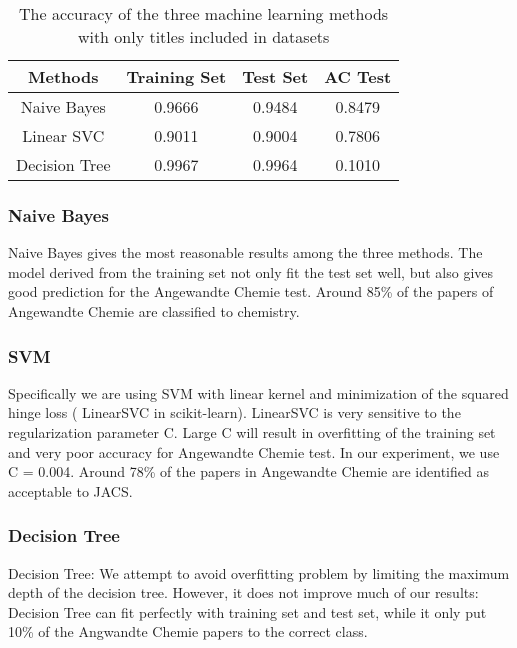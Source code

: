 \documentclass[conference]{IEEEtran}
\begin{document}
\begin{table}
    \caption{The accuracy of the three machine learning methods with only titles included in datasets\label{tab:acc-title}}
    \begin{center}
        \begin{tabular}{c | c | c | c}
            \hline
            \bf{Methods} & \bf{Training Set} & \bf{Test Set} & \bf{AC Test} \\
            \hline
            Naive Bayes & 0.9666 & 0.9484 & 0.8479 \\
            \hline
            Linear SVC & 0.9011 & 0.9004 & 0.7806 \\
            \hline
            Decision Tree & 0.9967 & 0.9964 & 0.1010 \\
            \hline
        \end{tabular}
    \end{center}
\end{table}

\subsubsection{Naive Bayes}
Naive Bayes gives the most reasonable results among the three methods. The model derived from the training set not only fit the test set well, but also gives good prediction for the Angewandte Chemie test. Around 85\% of the papers of Angewandte Chemie are classified to chemistry.

\subsubsection{SVM}
Specifically we are using SVM with linear kernel and minimization of the squared hinge loss ( LinearSVC in scikit-learn). LinearSVC is very sensitive to the regularization parameter C. Large C will result in overfitting of the training set and very poor accuracy for Angewandte Chemie test. In our experiment, we use C = 0.004. Around 78\% of the papers in Angewandte Chemie are identified as acceptable to JACS.

\subsubsection{Decision Tree}
Decision Tree: We attempt to avoid overfitting problem by limiting the maximum depth of the decision tree. However, it does not improve much of our results: Decision Tree can fit perfectly with training set and test set, while it only put 10\% of the Angwandte Chemie papers to the correct class.
\end{document}
